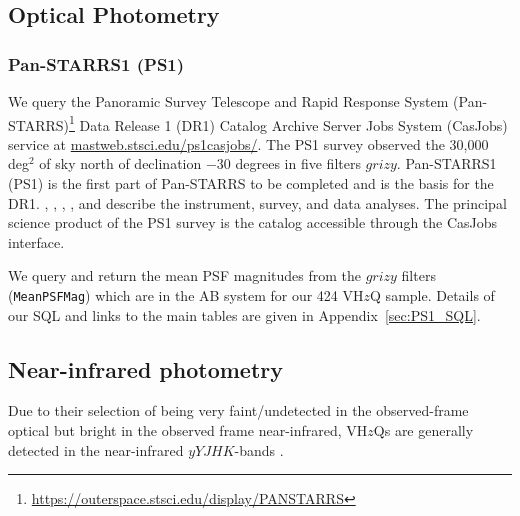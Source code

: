 \documentclass[usenatbib]{mnras}
\begin{document}
        
\subsection{Optical Photometry}
    \subsubsection{Pan-STARRS1 (PS1)} 
    We query the Panoramic Survey Telescope and Rapid Response System
    (Pan-STARRS)\footnote{\href{https://outerspace.stsci.edu/display/PANSTARRS}{https://outerspace.stsci.edu/display/PANSTARRS}}
    Data Release 1 (DR1) Catalog Archive Server Jobs System (CasJobs)
    service at
    \href{http://mastweb.stsci.edu/ps1casjobs/}{mastweb.stsci.edu/ps1casjobs/}.
    The PS1 survey observed the 30,000 deg$^{2}$ of sky north of
    declination $-30$ degrees in five filters $grizy$.  Pan-STARRS1 (PS1)
    is the first part of Pan-STARRS to be completed and is the basis for
    the DR1.  \citet{Chambers2016}, \citet{Magnier2016a},
    \citet{Waters2016}, \citet{Magnier2016b}, \citet{Magnier2016c} and
    \citet{Flewelling2016} describe the instrument, survey, and data
    analyses.  The principal science product of the PS1 survey is the
    catalog accessible through the CasJobs interface.
    
    We query and return the mean PSF magnitudes from the $grizy$ filters
    ({\tt MeanPSFMag}) which are in the AB system for our 424 VH$z$Q
    sample. Details of our SQL and links to the main tables are given
    in Appendix~\ref{sec:PS1_SQL}.
    
    \iffalse
    \subsubsection{DECam} 
    The Dark Energy Camera \citep[DECam][]{Flaugher2015} is 
    is a wide-field imager with a 2.2 degree diameter field of view 
    mounted at the prime focus of the Victor M. Blanco 4 m telescope 
    at the Cerro Tololo International Observatory. We use data 
    from both the Dark Energy Survey \citep[DES; ][]{DES2016} and 
    the DESI Legacy Imaging Survey \citep[DECaLS; ][]{Dey2018}. 
    \fi
    

\subsection{Near-infrared photometry}
Due to their selection of being very faint/undetected in the
observed-frame optical but bright in the observed frame near-infrared,
VH$z$Qs are generally detected in the near-infrared $yYJHK$-bands
\citep[$\approx$0.98-2.38$\mu$m; e.g., ][]{Peth2011}.
\end{document}
